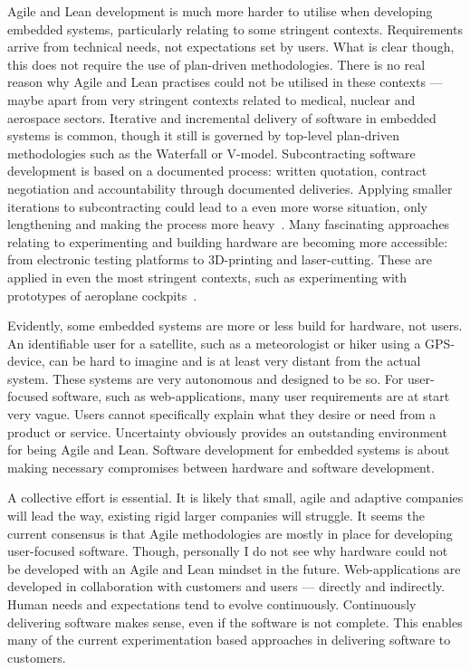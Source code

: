 \documentclass[english]{tktltiki2}
\begin{document}
Agile and Lean development is much more harder to utilise when developing embedded systems, particularly relating to some stringent contexts. Requirements arrive from technical needs, not expectations set by users. What is clear though, this does not require the use of plan-driven methodologies. There is no real reason why Agile and Lean practises could not be utilised in these contexts — maybe apart from very stringent contexts related to medical, nuclear and aerospace sectors. Iterative and incremental delivery of software in embedded systems is common, though it still is governed by top-level plan-driven methodologies such as the Waterfall or V-model. Subcontracting software development is based on a documented process: written quotation, contract negotiation and accountability through documented deliveries. Applying smaller iterations to subcontracting could lead to a even more worse situation, only lengthening and making the process more heavy~\cite{Hol15b}. Many fascinating approaches relating to experimenting and building hardware are becoming more accessible: from electronic testing platforms to 3D-printing and laser-cutting. These are applied in even the most stringent contexts, such as experimenting with prototypes of aeroplane cockpits~\cite{Air15}.

Evidently, some embedded systems are more or less build for hardware, not users. An identifiable user for a satellite, such as a meteorologist or hiker using a GPS-device, can be hard to imagine and is at least very distant from the actual system. These systems are very autonomous and designed to be so. For user-focused software, such as web-applications, many user requirements are at start very vague. Users cannot specifically explain what they desire or need from a product or service. Uncertainty obviously provides an outstanding environment for being Agile and Lean. Software development for embedded systems is about making necessary compromises between hardware and software development.

A collective effort is essential. It is likely that small, agile and adaptive companies will lead the way, existing rigid larger companies will struggle. It seems the current consensus is that Agile methodologies are mostly in place for developing user-focused software. Though, personally I do not see why hardware could not be developed with an Agile and Lean mindset in the future. Web-applications are developed in collaboration with customers and users — directly and indirectly. Human needs and expectations tend to evolve continuously. Continuously delivering software makes sense, even if the software is not complete. This enables many of the current experimentation based approaches in delivering software to customers.
\end{document}
